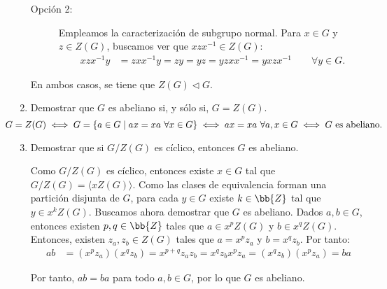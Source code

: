 \begin{ejercicio}
\begin{enumerate}
\begin{description}
            \item[Opción 2:]
            Empleamos la caracterización de subgrupo normal. Para $x\in G$ y $z\in Z(G)$, buscamos ver que $xzx^{-1}\in Z(G)$:
            \begin{align*}
                xzx^{-1}y &= zxx^{-1}y = zy = yz = yzxx^{-1} = yxzx^{-1}\qquad \forall y\in G.
            \end{align*}
        \end{description}
        En ambos casos, se tiene que $Z(G)\lhd G$.
        \item Demostrar que $G$ es abeliano si, y sólo si, $G=Z(G)$.
        \begin{equation*}
            \hspace{-1cm}G=Z(G) \iff G=\{a\in G\mid ax=xa\ \forall x\in G\} \iff ax=xa\ \forall a,x\in G \iff G\text{ es abeliano.}
        \end{equation*}
        \item\label{ej:4.4.4} Demostrar que si $G/Z(G)$ es cíclico, entonces $G$ es abeliano.
        
        Como $G/Z(G)$ es cíclico, entonces existe $x\in G$ tal que $G/Z(G)=\langle xZ(G)\rangle$. 
        Como las clases de equivalencia forman una partición disjunta de $G$, para cada $y\in G$ existe $k\in \bb{Z}$ tal que $y\in x^kZ(G)$. Buscamos ahora demostrar que $G$ es abeliano. Dados $a,b\in G$, entonces existen $p,q\in \bb{Z}$ tales que $a\in x^pZ(G)$ y $b\in x^qZ(G)$. Entonces, existen $z_a,z_b\in Z(G)$ tales que $a=x^pz_a$ y $b=x^qz_b$. Por tanto:
        \begin{align*}
            ab &= (x^pz_a)(x^qz_b) = x^{p+q}z_az_b = x^qz_b x^pz_a = (x^qz_b)(x^pz_a) = ba
        \end{align*}

        Por tanto, $ab=ba$ para todo $a,b\in G$, por lo que $G$ es abeliano.        
    \end{enumerate}
\end{ejercicio}

